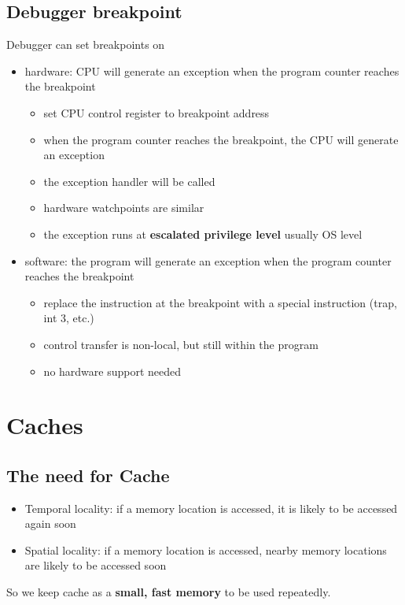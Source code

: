 \documentclass[letterpaper,12pt]{article}
\begin{document}
\subsection{Debugger breakpoint}
Debugger can set breakpoints on \begin{itemize}
    \item hardware: CPU will generate an exception when the program counter reaches the breakpoint\begin{itemize}
        \item set CPU control register to breakpoint address
        \item when the program counter reaches the breakpoint, the CPU will generate an exception
        \item the exception handler will be called
        \item hardware watchpoints are similar
        \item the exception runs at \textbf{escalated privilege level} usually OS level
    \end{itemize}
    \item software: the program will generate an exception when the program counter reaches the breakpoint\begin{itemize}
        \item replace the instruction at the breakpoint with a special instruction (trap, int 3, etc.)
        \item control transfer is non-local, but still within the program
        \item no hardware support needed
    \end{itemize}
\end{itemize}

\section{Caches}
\subsection{The need for Cache}
\begin{itemize}
    \item Temporal locality: if a memory location is accessed, it is likely to be accessed again soon
    \item Spatial locality: if a memory location is accessed, nearby memory locations are likely to be accessed soon
\end{itemize}
So we keep cache as a \textbf{small, fast memory} to be used repeatedly. 
\end{document}

